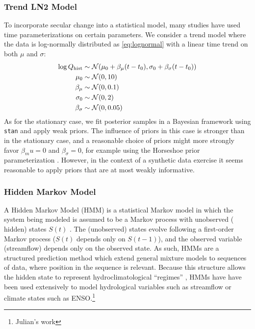 \documentclass[12pt]{article}
\begin{document}
\subsubsection{Trend LN2 Model\label{sec:method-trend}}

To incorporate secular change into a statistical model, many studies have used time parameterizations on certain parameters.
We consider a trend model where the data is log-normally distributed as \cref{eq:lognormal} with a linear time trend on both \( \mu \) and \( \sigma \):
\begin{align}
  \log Q_\text{hist} & \sim \mathcal{N} \qty(\mu_0 + \beta_\mu \qty(t - t_0), \sigma_0 + \beta_\sigma \qty(t-t_0)) \\
  \mu_0 & \sim \mathcal{N} \qty(0, 10) \\
  \beta_\mu & \sim \mathcal{N} \qty(0, 0.1) \\
  \sigma_0 & \sim \mathcal{N} \qty(0, 2) \\
  \beta_\sigma & \sim \mathcal{N} \qty(0, 0.05)
\end{align}
As for the stationary case, we fit posterior samples in a Bayesian framework using \texttt{stan} and apply weak priors.
The influence of priors in this case is stronger than in the stationary case, and a reasonable choice of priors might more strongly favor \(\beta_mu=0\) and \(\beta_\sigma=0\), for example using the Horseshoe prior parameterization \citep{Piironen2016a}.
However, in the context of a synthetic data exercise it seems reasonable to apply priors that are at most weakly informative.

\subsubsection{Hidden Markov Model\label{sec:method-HMM}}

A Hidden Markov Model (HMM) is a statistical Markov model in which the system being modeled is assumed to be a Markov process with unobserved (\ie{} hidden) states \(S(t)\) \citep{Rabiner1986}.
The (unobserved) states evolve following a first-order Markov process (\(S(t)\) depends only on \(S(t-1)\)), and the observed variable (streamflow) depends only on the observed state.
As such, HMMs are a structured prediction method which extend general mixture models to sequences of data, where position in the sequence is relevant.
Because this structure allows the hidden state to represent hydroclimatological ``regimes'' \citep{Reinhold1982,Michelangeli1995,Merz2014}, HMMs have have been used extensively to model hydrological variables such as streamflow \citep[\ie{}][]{Bracken2016} or climate states such as ENSO.\footnote{Julian's work}
\end{document}

